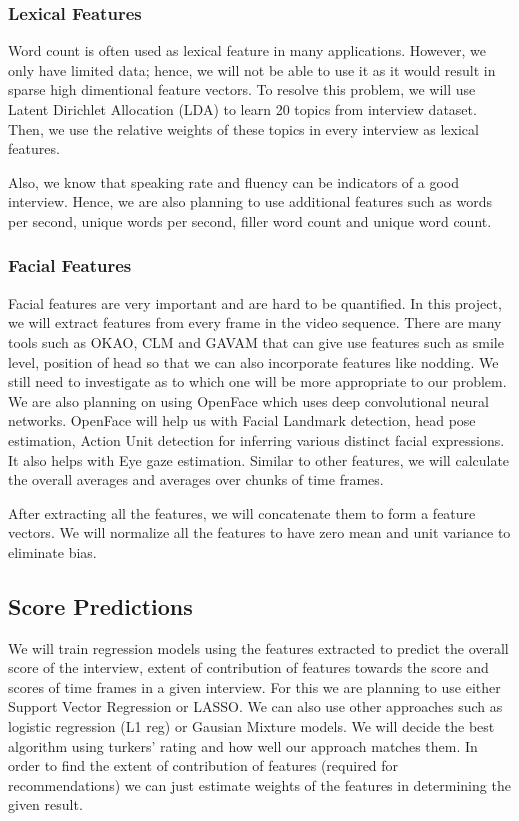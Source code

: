 \documentclass[11pt]{article}
\begin{document}
\subsubsection{Lexical Features}
Word count is often used as lexical feature in many applications. However, we only have limited data; hence, we will not be able to use it as it would result in sparse high dimentional feature vectors. To resolve this problem, we will use Latent Dirichlet Allocation (LDA) to learn 20 topics from interview dataset. Then, we use the relative weights of these topics in every interview as lexical features.

Also, we know that speaking rate and fluency can be indicators of a good interview. Hence, we are also planning to use additional features such as words per second, unique words per second, filler word count and unique word count. 
\subsubsection{Facial Features}
Facial features are very important and are hard to be quantified. In this project, we will extract features from every frame in the video sequence. There are many tools such as OKAO, CLM and GAVAM that can give use features such as smile level, position of head so that we can also incorporate features like nodding. We still need to investigate as to which one will be more appropriate to our problem. We are also planning on using OpenFace which uses deep convolutional neural networks. OpenFace will help us with Facial Landmark detection, head pose estimation, Action Unit detection for inferring various distinct facial expressions. It also helps with Eye gaze estimation. Similar to other features, we will calculate the overall averages and averages over chunks of time frames.

After extracting all the features, we will concatenate them to form a feature vectors. We will normalize all the features to have zero mean and unit variance to eliminate bias.

\subsection{Score Predictions}
We will train regression models using the features extracted to predict the overall score of the interview, extent of contribution of features towards the score and scores of time frames in a given interview. For this we are planning to use either Support Vector Regression or LASSO. We can also use other approaches such as logistic regression (L1 reg) or Gausian Mixture models. We will decide the best algorithm using turkers' rating and how well our approach matches them. In order to find the extent of contribution of features (required for recommendations) we can just estimate weights of the features in determining the given result.
\end{document}
